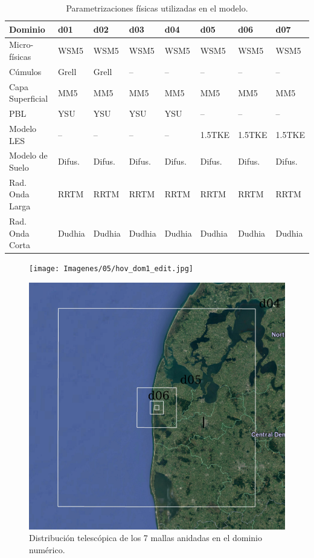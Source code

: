 \begin{table}[h!]
	\caption{Parametrizaciones físicas utilizadas en el modelo.}\label{tab:param_fis}
	\centering\footnotesize
	\begin{tabular}{llllllll}
		\toprule
		Dominio 				& d01	&	d02	&	d03	&	d04	&	d05	&	d06 &	d07 \\
		\midrule
		Micro-físicas		 	& WSM5 & WSM5 & WSM5 &WSM5&WSM5&WSM5&WSM5  \\
		Cúmulos			 		& Grell & Grell & -- & -- & -- & -- & -- \\ 
		Capa Superficial	 	& MM5 & MM5 & MM5 & MM5 & MM5 & MM5 & MM5 \\
		PBL				 		& YSU & YSU & YSU & YSU & -- & -- & -- \\
		Modelo LES				 		& -- & -- & -- & -- & 1.5TKE & 1.5TKE & 1.5TKE \\
		Modelo de Suelo 		& Difus. & Difus. & Difus. & Difus. & Difus. & Difus. & Difus. \\
		Rad. Onda Larga	& RRTM &RRTM&RRTM&RRTM&RRTM&RRTM&RRTM \\
		Rad. Onda Corta	& Dudhia &Dudhia&Dudhia&Dudhia&Dudhia&Dudhia&Dudhia \\
		\bottomrule
	\end{tabular}
\end{table}

\begin{figure}[H]
	\centering
	\texttt{[image: Imagenes/05/hov\_dom1\_edit.jpg]}%
	
	\bigskip%
	
	\includegraphics[width=0.6\linewidth,page=1,trim={5mm 3mm 3mm 3mm},clip,frame]{Imagenes/05/hov_dom2_edit.jpg}%
	\caption{Distribución telescópica de los 7 mallas anidadas en el dominio numérico.}
	\label{fig:dom_telesco}
\end{figure}


